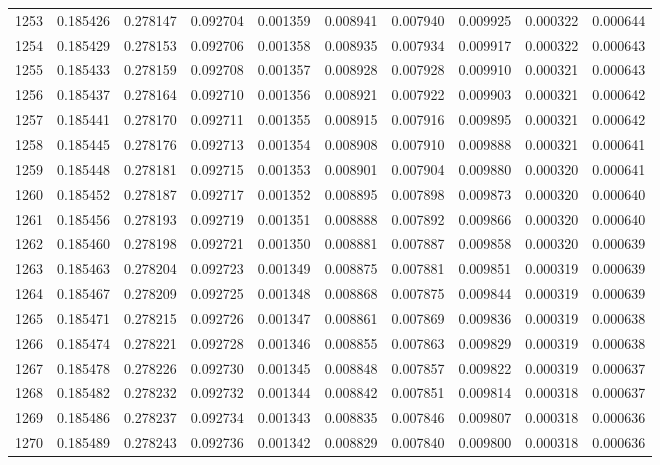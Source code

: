 \begin{tabular}{lrrrrrrrrr}
1253 & 0.185426 & 0.278147 & 0.092704 & 0.001359 & 0.008941 & 0.007940 & 0.009925 & 0.000322 & 0.000644 \\
1254 & 0.185429 & 0.278153 & 0.092706 & 0.001358 & 0.008935 & 0.007934 & 0.009917 & 0.000322 & 0.000643 \\
1255 & 0.185433 & 0.278159 & 0.092708 & 0.001357 & 0.008928 & 0.007928 & 0.009910 & 0.000321 & 0.000643 \\
1256 & 0.185437 & 0.278164 & 0.092710 & 0.001356 & 0.008921 & 0.007922 & 0.009903 & 0.000321 & 0.000642 \\
1257 & 0.185441 & 0.278170 & 0.092711 & 0.001355 & 0.008915 & 0.007916 & 0.009895 & 0.000321 & 0.000642 \\
1258 & 0.185445 & 0.278176 & 0.092713 & 0.001354 & 0.008908 & 0.007910 & 0.009888 & 0.000321 & 0.000641 \\
1259 & 0.185448 & 0.278181 & 0.092715 & 0.001353 & 0.008901 & 0.007904 & 0.009880 & 0.000320 & 0.000641 \\
1260 & 0.185452 & 0.278187 & 0.092717 & 0.001352 & 0.008895 & 0.007898 & 0.009873 & 0.000320 & 0.000640 \\
1261 & 0.185456 & 0.278193 & 0.092719 & 0.001351 & 0.008888 & 0.007892 & 0.009866 & 0.000320 & 0.000640 \\
1262 & 0.185460 & 0.278198 & 0.092721 & 0.001350 & 0.008881 & 0.007887 & 0.009858 & 0.000320 & 0.000639 \\
1263 & 0.185463 & 0.278204 & 0.092723 & 0.001349 & 0.008875 & 0.007881 & 0.009851 & 0.000319 & 0.000639 \\
1264 & 0.185467 & 0.278209 & 0.092725 & 0.001348 & 0.008868 & 0.007875 & 0.009844 & 0.000319 & 0.000639 \\
1265 & 0.185471 & 0.278215 & 0.092726 & 0.001347 & 0.008861 & 0.007869 & 0.009836 & 0.000319 & 0.000638 \\
1266 & 0.185474 & 0.278221 & 0.092728 & 0.001346 & 0.008855 & 0.007863 & 0.009829 & 0.000319 & 0.000638 \\
1267 & 0.185478 & 0.278226 & 0.092730 & 0.001345 & 0.008848 & 0.007857 & 0.009822 & 0.000319 & 0.000637 \\
1268 & 0.185482 & 0.278232 & 0.092732 & 0.001344 & 0.008842 & 0.007851 & 0.009814 & 0.000318 & 0.000637 \\
1269 & 0.185486 & 0.278237 & 0.092734 & 0.001343 & 0.008835 & 0.007846 & 0.009807 & 0.000318 & 0.000636 \\
1270 & 0.185489 & 0.278243 & 0.092736 & 0.001342 & 0.008829 & 0.007840 & 0.009800 & 0.000318 & 0.000636 \\

\end{tabular}
